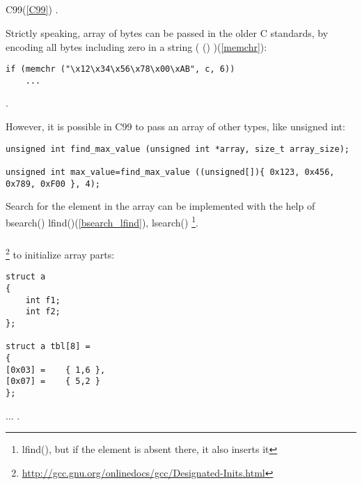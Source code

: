 ﻿\subsection{}

 C99(\ref{C99})
.

{Strictly speaking, array of bytes can be passed in the older C standards, by encoding all bytes
including zero in a string}
( ()
)(\ref{memchr}):

\begin{lstlisting}
if (memchr ("\x12\x34\x56\x78\x00\xAB", c, 6))
	...
\end{lstlisting}

.

{However, it is possible in C99 to pass an array of other types, like}
unsigned int:

\begin{lstlisting}
unsigned int find_max_value (unsigned int *array, size_t array_size);

unsigned int max_value=find_max_value ((unsigned[]){ 0x123, 0x456, 0x789, 0xF00 }, 4);
\end{lstlisting}

{Search for the element in the array can be implemented with the help of} bsearch() \OrENRU lfind()(\ref{bsearch_lfind}),
 lsearch()
\footnote{ lfind(), 
{but if the element is absent there, it also inserts it}}.

\subsubsection{}

\footnote{\url{http://gcc.gnu.org/onlinedocs/gcc/Designated-Inits.html}} 
{to initialize array parts}:

\begin{lstlisting}
struct a
{
	int f1;
	int f2;
};
 
struct a tbl[8] =
{
[0x03] =	{ 1,6 },
[0x07] =	{ 5,2 } 
};
\end{lstlisting}

... .

